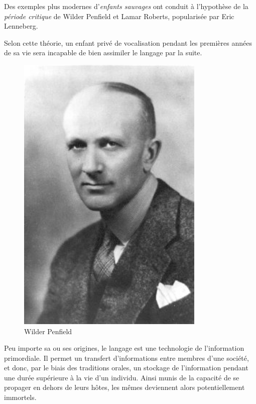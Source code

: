 \begin{minipage}[H]{0.65\linewidth}
Des exemples plus modernes d'\emph{enfants sauvages} ont conduit à l'hypothèse de la \emph{période critique} de Wilder Penfield et Lamar Roberts\cite{penfield2003speech}, popularisée par Eric Lenneberg\cite{lenneberg-crit-period}.

Selon cette théorie, un enfant privé de vocalisation pendant les premières années de sa vie sera incapable de bien assimiler le langage par la suite.

\end{minipage}
\begin{minipage}[H]{0.34\linewidth}
  \begin{figure}[H]
  \centering
  \includegraphics[width=0.8\textwidth]{../resources/illustrations/penfield}
  \caption{Wilder Penfield}
  \end{figure}
\end{minipage}

Peu importe sa ou ses origines, le langage est une technologie de l'information primordiale. Il permet un transfert d'informations entre membres d'une société, et donc, par le biais des traditions orales, un stockage de l'information pendant une durée supérieure à la vie d'un individu. Ainsi munis de la capacité de se propager en dehors de leurs hôtes, les mêmes deviennent alors potentiellement immortels.

